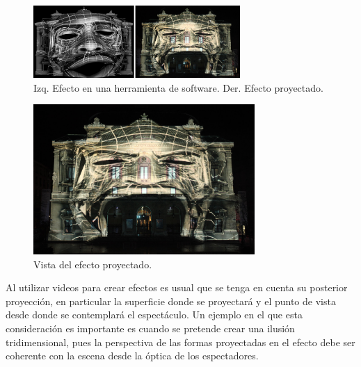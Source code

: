 \begin{minipage}{0.50\textwidth}
	\begin{flushleft} \large
		\begin{figure}[H]
		  \centering
			\includegraphics[width=0.7\textwidth]{./Cap2_videomapping/celestin_head.jpg}
		  \caption[http://mappingvideo.blogspot.com/]{Izq. Efecto en una herramienta de software. Der. Efecto proyectado.}
		  \label{fig:Efecto1}
		\end{figure}
	\end{flushleft}
\end{minipage}
\begin{minipage}{0.50\textwidth}
	\begin{flushright} \large
		\begin{figure}[H]
		  \centering
			\includegraphics[width=0.75\textwidth]{./Cap2_videomapping/realcelestins_headshot.jpg}
		  \caption[http://mappingvideo.blogspot.com/]{Vista del efecto proyectado.}
		  \label{fig:Efecto2}
		\end{figure}
	\end{flushright}
\end{minipage}

Al utilizar videos para crear efectos es usual que se tenga en cuenta su posterior proyección, en particular la superficie donde se proyectará y el punto de vista desde donde se contemplará el espectáculo.
Un ejemplo en el que esta consideración es importante es cuando se pretende crear una ilusión tridimensional, pues la perspectiva de las formas proyectadas en el efecto debe ser coherente con la escena desde la óptica de los espectadores.

